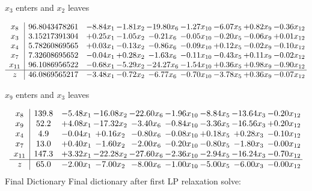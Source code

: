 \documentclass[8pt]{article}
\begin{document}
 $ x_{3} $ enters and $ x_{2} $ leaves 

 \[\begin{array}{c| c c@{\hskip 2pt} c@{\hskip 2pt} c@{\hskip 2pt} c@{\hskip 2pt} c@{\hskip 2pt} c@{\hskip 2pt} c@{\hskip 2pt} }
 x_{8}   &  96.8043478261 & -8.84 x_{1} & -1.81 x_{2} & -19.80 x_{6} & -1.27 x_{10} & -6.07 x_{5} & +  0.82 x_{9} & -0.36 x_{12}\\
 x_{3}   &  3.15217391304 & +  0.25 x_{1} & -1.05 x_{2} & -0.21 x_{6} & -0.05 x_{10} & -0.20 x_{5} & -0.06 x_{9} & +  0.01 x_{12}\\
 x_{4}   &  5.78260869565 & +  0.03 x_{1} & -0.13 x_{2} & -0.86 x_{6} & -0.09 x_{10} & +  0.12 x_{5} & -0.02 x_{9} & -0.10 x_{12}\\
 x_{7}   &  7.32608695652 & -0.04 x_{1} & +  0.28 x_{2} & -1.63 x_{6} & -0.11 x_{10} & -0.43 x_{5} & +  0.11 x_{9} & -0.02 x_{12}\\
 x_{11}   &  96.1086956522 & -0.68 x_{1} & -5.29 x_{2} & -24.27 x_{6} & -1.54 x_{10} & +  0.36 x_{5} & +  0.98 x_{9} & -0.90 x_{12}\\
\hline
z    &  46.0869565217 & -3.48 x_{1} & -0.72 x_{2} & -6.77 x_{6} & -0.70 x_{10} & -3.78 x_{5} & +  0.36 x_{9} & -0.07 x_{12}\\
\end{array}\]


 $ x_{9} $ enters and $ x_{3} $ leaves 

 \[\begin{array}{c| c c@{\hskip 2pt} c@{\hskip 2pt} c@{\hskip 2pt} c@{\hskip 2pt} c@{\hskip 2pt} c@{\hskip 2pt} c@{\hskip 2pt} }
 x_{8}   &  139.8 & -5.48 x_{1} & -16.08 x_{2} & -22.60 x_{6} & -1.96 x_{10} & -8.84 x_{5} & -13.64 x_{3} & -0.20 x_{12}\\
 x_{9}   &  52.2 & +  4.08 x_{1} & -17.32 x_{2} & -3.40 x_{6} & -0.84 x_{10} & -3.36 x_{5} & -16.56 x_{3} & +  0.20 x_{12}\\
 x_{4}   &  4.9 & -0.04 x_{1} & +  0.16 x_{2} & -0.80 x_{6} & -0.08 x_{10} & +  0.18 x_{5} & +  0.28 x_{3} & -0.10 x_{12}\\
 x_{7}   &  13.0 & +  0.40 x_{1} & -1.60 x_{2} & -2.00 x_{6} & -0.20 x_{10} & -0.80 x_{5} & -1.80 x_{3} & -0.00 x_{12}\\
 x_{11}   &  147.3 & +  3.32 x_{1} & -22.28 x_{2} & -27.60 x_{6} & -2.36 x_{10} & -2.94 x_{5} & -16.24 x_{3} & -0.70 x_{12}\\
\hline
z    &  65.0 & -2.00 x_{1} & -7.00 x_{2} & -8.00 x_{6} & -1.00 x_{10} & -5.00 x_{5} & -6.00 x_{3} & -0.00 x_{12}\\
\end{array}\]
Final Dictionary
Final dictionary after first LP relaxation solve: 
\end{document}
